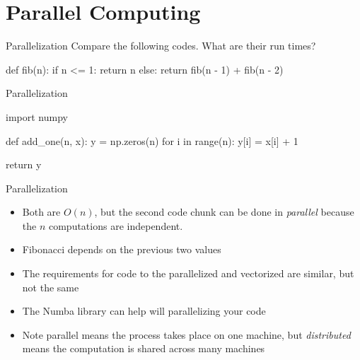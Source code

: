 \documentclass[
  ignorenonframetext,
]{beamer}
\newenvironment{Shaded}{\begin{snugshade}}{\end{snugshade}}
\newcommand{\BuiltInTok}[1]{\textcolor[rgb]{0.00,0.23,0.31}{#1}}
\newcommand{\ControlFlowTok}[1]{\textcolor[rgb]{0.00,0.23,0.31}{#1}}
\newcommand{\DecValTok}[1]{\textcolor[rgb]{0.68,0.00,0.00}{#1}}
\newcommand{\ImportTok}[1]{\textcolor[rgb]{0.00,0.46,0.62}{#1}}
\newcommand{\KeywordTok}[1]{\textcolor[rgb]{0.00,0.23,0.31}{#1}}
\newcommand{\NormalTok}[1]{\textcolor[rgb]{0.00,0.23,0.31}{#1}}
\newcommand{\OperatorTok}[1]{\textcolor[rgb]{0.37,0.37,0.37}{#1}}
\begin{document}
\hypertarget{parallel-computing}{%
\section{Parallel Computing}\label{parallel-computing}}

\begin{frame}[fragile]{Parallelization}
\protect\hypertarget{parallelization}{}
Compare the following codes. What are their run times?

\begin{Shaded}
\begin{Highlighting}[]
\KeywordTok{def}\NormalTok{ fib(n):}
  \ControlFlowTok{if}\NormalTok{ n }\OperatorTok{\textless{}=} \DecValTok{1}\NormalTok{:}
    \ControlFlowTok{return}\NormalTok{ n}
  \ControlFlowTok{else}\NormalTok{:}
    \ControlFlowTok{return}\NormalTok{ fib(n }\OperatorTok{{-}} \DecValTok{1}\NormalTok{) }\OperatorTok{+}\NormalTok{ fib(n }\OperatorTok{{-}} \DecValTok{2}\NormalTok{)}
\end{Highlighting}
\end{Shaded}
\end{frame}

\begin{frame}[fragile]{Parallelization}
\protect\hypertarget{parallelization-1}{}
\begin{Shaded}
\begin{Highlighting}[]
\ImportTok{import}\NormalTok{ numpy}

\KeywordTok{def}\NormalTok{ add\_one(n, x):}
\NormalTok{  y }\OperatorTok{=}\NormalTok{ np.zeros(n)}
  \ControlFlowTok{for}\NormalTok{ i }\KeywordTok{in} \BuiltInTok{range}\NormalTok{(n):}
\NormalTok{    y[i] }\OperatorTok{=}\NormalTok{ x[i] }\OperatorTok{+} \DecValTok{1}
        
  \ControlFlowTok{return}\NormalTok{ y}
\end{Highlighting}
\end{Shaded}
\end{frame}

\begin{frame}{Parallelization}
\protect\hypertarget{parallelization-2}{}
\begin{itemize}
\item
  Both are \(O(n)\), but the second code chunk can be done in
  \emph{parallel} because the \(n\) computations are independent.
\item
  Fibonacci depends on the previous two values
\item
  The requirements for code to the parallelized and vectorized are
  similar, but not the same
\item
  The Numba library can help will parallelizing your code
\item
  Note parallel means the process takes place on one machine, but
  \emph{distributed} means the computation is shared across many
  machines
\end{itemize}
\end{frame}
\end{document}
